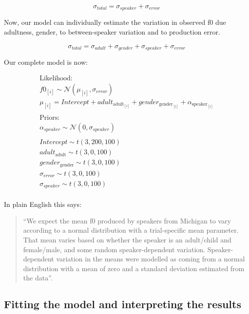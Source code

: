 \documentclass[
]{book}
\begin{document}
\[
\sigma_{total} = \sigma_{speaker} + \sigma_{error}
\]

Now, our model can individually estimate the variation in observed f0 due adultness, gender, to between-speaker variation and to production error.

\[
\sigma_{total} = \sigma_{adult} + \sigma_{gender}+\sigma_{speaker} + \sigma_{error}
\]

Our complete model is now:

\begin{equation}
\begin{split}
\textrm{Likelihood:} \\
f0_{[i]} \sim \mathcal{N}(\mu_{[i]},\sigma_{error}) \\
\mu_{[i]} = Intercept + adult_{\mathrm{adult}_{[i]}}+gender_{\mathrm{gender}_{[i]}} + \alpha_{\mathrm{speaker}_{[i]}} \\\\
\textrm{Priors:} \\
\alpha_{speaker} \sim \mathcal{N}(0,\sigma_{speaker}) \\ \\ 
Intercept \sim t(3, 200, 100) \\ 
adult_{\mathrm{adult}} \sim t(3, 0, 100) \\ 
gender_{\mathrm{gender}} \sim t(3, 0, 100) \\ 
\sigma_{error} \sim t(3, 0, 100) \\
\sigma_{speaker} \sim t(3, 0, 100) \\ 
\end{split}
\label{eq:42}
\end{equation}

In plain English this says:

\begin{quote}
``We expect the mean f0 produced by speakers from Michigan to vary according to a normal distribution with a trial-specific mean parameter. That mean varies based on whether the speaker is an adult/child and female/male, and some random speaker-dependent variation. Speaker-dependent variation in the means were modelled as coming from a normal distribution with a mean of zero and a standard deviation estimated from the data''.
\end{quote}

\hypertarget{fitting-the-model-and-interpreting-the-results}{%
\subsection{Fitting the model and interpreting the results}\label{fitting-the-model-and-interpreting-the-results}}
\end{document}
